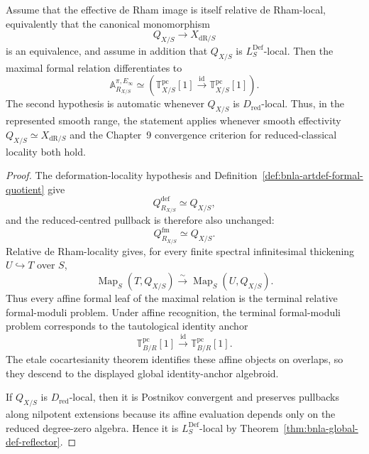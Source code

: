 \begin{corollary}
\label{cor:bnla-maximal-spectral-algebroid}
Assume that the effective de Rham image is itself relative de Rham-local,
equivalently that the canonical monomorphism
\[
    Q_{X/S}\longrightarrow X_{\mathrm{dR}/S}
\]
is an equivalence, and assume in addition that $Q_{X/S}$ is
$L^{\mathrm{Def}}_S$-local.  Then the maximal formal relation differentiates
to
\[
\boxed{
    \mathbb A^{\pi,E_\infty}_{R_{X/S}}
    \simeq
    \left(
        \mathbb T^{\mathrm{pc}}_{X/S}[1]
        \xrightarrow{\operatorname{id}}
        \mathbb T^{\mathrm{pc}}_{X/S}[1]
    \right).}
\]
The second hypothesis is automatic whenever $Q_{X/S}$ is
$D_{\mathrm{red}}$-local.  Thus, in the represented smooth range, the
statement applies whenever smooth effectivity
$Q_{X/S}\simeq X_{\mathrm{dR}/S}$ and the Chapter~9 convergence criterion for
reduced-classical locality both hold.
\end{corollary}

\begin{proof}
The deformation-locality hypothesis and
Definition~\ref{def:bnla-artdef-formal-quotient} give
\[
    Q^{\mathrm{def}}_{R_{X/S}}
    \simeq
    Q_{X/S},
\]
and the reduced-centred pullback is therefore also unchanged:
\[
    Q^{\mathrm{fm}}_{R_{X/S}}
    \simeq
    Q_{X/S}.
\]
Relative de Rham-locality gives, for every finite spectral infinitesimal
thickening $U\hookrightarrow T$ over $S$,
\[
    \operatorname{Map}_S(T,Q_{X/S})
    \xrightarrow{\sim}
    \operatorname{Map}_S(U,Q_{X/S}).
\]
Thus every affine formal leaf of the maximal relation is the terminal
relative formal-moduli problem.  Under affine recognition, the terminal
formal-moduli problem corresponds to the tautological identity anchor
\[
    \mathbb T^{\mathrm{pc}}_{B/R}[1]
    \xrightarrow{\operatorname{id}}
    \mathbb T^{\mathrm{pc}}_{B/R}[1].
\]
The etale cocartesianity theorem identifies these affine objects on overlaps,
so they descend to the displayed global identity-anchor algebroid.

If $Q_{X/S}$ is $D_{\mathrm{red}}$-local, then it is Postnikov convergent and
preserves pullbacks along nilpotent extensions because its affine evaluation
depends only on the reduced degree-zero algebra.  Hence it is
$L^{\mathrm{Def}}_S$-local by
Theorem~\ref{thm:bnla-global-def-reflector}.
\end{proof}

